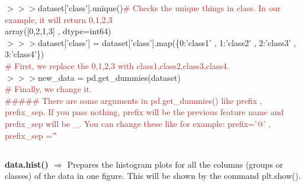 \documentclass[a4paper,18pt]{article}
\begin{document}
$>>>$dataset['class'].unique(){\textcolor{brown}{\# Checks the unique things in class. In our example, it will return 0,1,2,3}}\\

\hspace*{14pt}array([0,2,1,3] , dtype=int64)\\

$>>>$dataset['class'] = dataset['class'].map(\{0:'class1' , 1:'class2' , 2:'class3' , 3:'class4'\})\\

{\textcolor{brown}{\# First, we replace the 0,1,2,3 with class1,class2,class3,class4.}}\\

$>>>$new\_data = pd.get\_dummies(dataset)\\

{\textcolor{brown}{\# Finally, we change it.}}\\


{\textcolor{brown}{\#\#\#\#\# There are some arguments in pd.get\_dummies() like prefix , prefix\_sep. If you pass nothing, prefix will be the previous feature name and prefix\_sep will be \_. You can change these like for example: prefix='@' , prefix\_sep ='\^' }}\\


\subsection{\colorbox {matgreen}{\color{white}{\large data.hist()}}}
\textbf{data.hist() $\Rightarrow$} Prepares the histogram plots for all the columns (groups or classes) of the data in one figure. This will be shown by the command plt.show().\\\\

\end{document}
